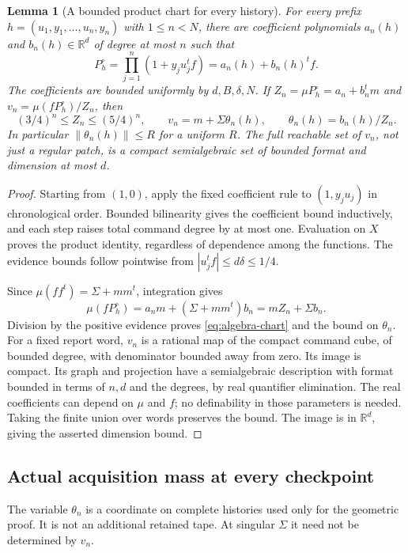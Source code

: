 \documentclass[11pt]{amsart}
\newtheorem{lemma}[theorem]{Lemma}
\theoremstyle{definition}\newtheorem{definition}[theorem]{Definition}
\theoremstyle{remark}\newtheorem{remark}[theorem]{Remark}
\newcommand{\R}{\mathbb R}\newcommand{\N}{\mathbb N}\newcommand{\C}{\mathbb C}
\begin{document}
\begin{lemma}[A bounded product chart for every history]
\label{lem:algebra-product-chart}
For every prefix $h=(u_1,y_1,\ldots,u_n,y_n)$ with $1\le n<N$, there
are coefficient polynomials $a_n(h)$ and $b_n(h)\in\R^d$ of degree at
most $n$ such that
\[
 P_h^\circ=\prod_{j=1}^n(1+y_j u_j^tf)=a_n(h)+b_n(h)^tf.
\]
The coefficients are bounded uniformly by $d,B,\delta,N$. If
$Z_n=\mu P_h^\circ=a_n+b_n^tm$ and $v_n=\mu(fP_h^\circ)/Z_n$, then
\begin{equation}\label{eq:algebra-chart}
 (3/4)^n\le Z_n\le(5/4)^n,\qquad
 v_n=m+\Sigma\theta_n(h),\qquad \theta_n(h)=b_n(h)/Z_n.
\end{equation}
In particular $\|\theta_n(h)\|\le R$ for a uniform $R$.
The full reachable set of $v_n$, not just a regular patch, is a compact
semialgebraic set of bounded format and dimension at most $d$.
\end{lemma}
\begin{proof}
Starting from $(1,0)$, apply the fixed coefficient rule to
$(1,y_j u_j)$ in chronological order. Bounded bilinearity gives the
coefficient bound inductively, and each step raises total command
degree by at most one. Evaluation on $X$ proves the product identity,
regardless of dependence among the functions. The evidence bounds follow
pointwise from $|u_j^tf|\le d\delta\le1/4$.

Since $\mu(ff^t)=\Sigma+mm^t$, integration gives
\[
 \mu(fP_h^\circ)=a_nm+(\Sigma+mm^t)b_n
                       =mZ_n+\Sigma b_n.
\]
Division by the positive evidence proves \eqref{eq:algebra-chart} and
the bound on $\theta_n$. For a fixed report word, $v_n$ is a rational
map of the compact command cube, of bounded degree, with denominator
bounded away from zero. Its image is compact. Its graph and projection
have a semialgebraic description with format bounded in terms of
$n,d$ and the degrees, by real quantifier elimination. The real
coefficients can depend on $\mu$ and $f$; no definability in those
parameters is needed. Taking the finite union over words preserves the
bound. The image is in $\R^d$, giving the asserted dimension bound.
\end{proof}

\subsection{Actual acquisition mass at every checkpoint}
The variable $\theta_n$ is a coordinate on complete histories used only
for the geometric proof. It is not an additional retained tape. At
singular $\Sigma$ it need not be determined by $v_n$.
\end{document}
